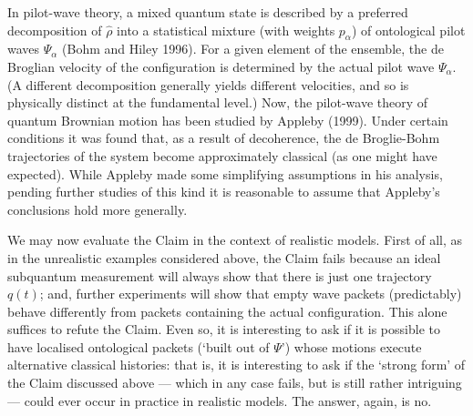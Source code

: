 \documentclass{article}%
\begin{document}
In pilot-wave theory, a mixed quantum state is described by a preferred
decomposition of $\hat{\rho}$ into a statistical mixture (with weights
$p_{\alpha}$) of ontological pilot waves $\Psi_{\alpha}$ (Bohm and Hiley
1996). For a given element of the ensemble, the de Broglian velocity of the
configuration is determined by the actual pilot wave $\Psi_{\alpha}$. (A
different decomposition generally yields different velocities, and so is
physically distinct at the fundamental level.) Now, the pilot-wave theory of
quantum Brownian motion has been studied by Appleby (1999). Under certain
conditions it was found that, as a result of decoherence, the de Broglie-Bohm
trajectories of the system become approximately classical (as one might have
expected). While Appleby made some simplifying assumptions in his analysis,
pending further studies of this kind it is reasonable to assume that Appleby's
conclusions hold more generally.

We may now evaluate the Claim in the context of realistic models. First of
all, as in the unrealistic examples considered above, the Claim fails because
an ideal subquantum measurement will always show that there is just one
trajectory $q(t)$; and, further experiments will show that empty wave packets
(predictably) behave differently from packets containing the actual
configuration. This alone suffices to refute the Claim. Even so, it is
interesting to ask if it is possible to have localised ontological packets
(`built out of $\Psi$') whose motions execute alternative classical histories:
that is, it is interesting to ask if the `strong form' of the Claim discussed
above --- which in any case fails, but is still rather intriguing --- could
ever occur in practice in realistic models. The answer, again, is no.
\end{document}
